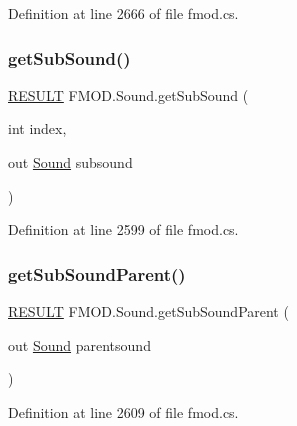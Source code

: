 Definition at line 2666 of file fmod.\+cs.

\mbox{\label{class_f_m_o_d_1_1_sound_ae3794b3962bccc1fbd27bfc41748b627}} 
\subsubsection{\texorpdfstring{get\+Sub\+Sound()}{getSubSound()}}
{\footnotesize\ttfamily \hyperlink{namespace_f_m_o_d_a305d1176ef3f8c8815861a60407ac33d}{R\+E\+S\+U\+LT} F\+M\+O\+D.\+Sound.\+get\+Sub\+Sound (\begin{DoxyParamCaption}\item[{int}]{index,  }\item[{out \hyperlink{class_f_m_o_d_1_1_sound}{Sound}}]{subsound }\end{DoxyParamCaption})}



Definition at line 2599 of file fmod.\+cs.

\mbox{\label{class_f_m_o_d_1_1_sound_a0ac34eece385d2dfd82ad0e1f9de9d51}} 
\subsubsection{\texorpdfstring{get\+Sub\+Sound\+Parent()}{getSubSoundParent()}}
{\footnotesize\ttfamily \hyperlink{namespace_f_m_o_d_a305d1176ef3f8c8815861a60407ac33d}{R\+E\+S\+U\+LT} F\+M\+O\+D.\+Sound.\+get\+Sub\+Sound\+Parent (\begin{DoxyParamCaption}\item[{out \hyperlink{class_f_m_o_d_1_1_sound}{Sound}}]{parentsound }\end{DoxyParamCaption})}



Definition at line 2609 of file fmod.\+cs.

\mbox{\label{class_f_m_o_d_1_1_sound_a8d113568f0a7c1ab2a79c4a91fa88c02}} 
